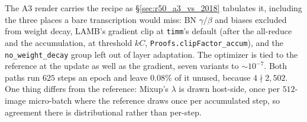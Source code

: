 \medskip\noindent The A3 render carries the recipe as
\S\ref{sec:r50_a3_vs_2018} tabulates it, including the three places a bare
transcription would miss: BN $\gamma/\beta$ and biases excluded from weight
decay, LAMB's gradient clip at \texttt{timm}'s default (after the all-reduce
and the accumulation, at threshold $kC$,
\texttt{Proofs.clipFactor\_accum}), and the \texttt{no\_weight\_decay} group
left out of layer adaptation. The optimizer is tied to the reference at the
update as well as the gradient, seven variants to $\sim\!10^{-7}$. Both
paths run $625$ steps an epoch and leave $0.08\%$ of it unused, because
$4 \nmid 2{,}502$. One thing differs from the reference: Mixup's $\lambda$
is drawn host-side, once per $512$-image micro-batch where the reference
draws once per accumulated step, so agreement there is distributional
rather than per-step.


